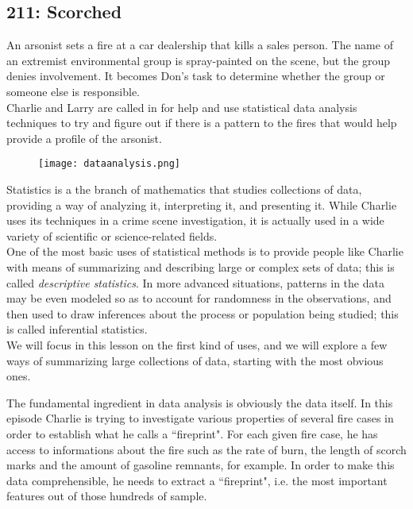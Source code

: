 \newpage
\subsection{211: Scorched}\label{211}

An arsonist sets a fire at a car dealership that kills a sales person. The name of an extremist environmental group is spray-painted on the scene, but the group denies involvement. It becomes Don's task to determine whether the group or someone else is responsible. \\

Charlie and Larry are called in for help and use statistical data analysis techniques to try and figure out if there is a pattern to the fires that would help provide a profile of the arsonist. \\

\begin{figure}[H]
   \centering
   \texttt{[image: dataanalysis.png]} 
\end{figure}


Statistics is a the branch of mathematics that studies collections of data, providing a way of analyzing it, interpreting it, and presenting it. While Charlie uses its techniques in a crime scene investigation, it is actually used in a wide variety of scientific or science-related fields. \\

One of the most basic uses of statistical methods is to provide people like Charlie with means of summarizing and describing large or complex sets of data; this is called \emph{descriptive statistics}. In more advanced situations, patterns in the data may be even modeled so as to account for randomness in the observations, and then used to draw inferences about the process or population being studied; this is called inferential statistics. \\

We will focus in this lesson on the first kind of uses, and we will explore a few ways of summarizing large collections of data, starting with the most obvious ones. \\


The fundamental ingredient in data analysis is obviously the data itself. In this episode Charlie is trying to investigate various properties of several fire cases in order to establish what he calls a ``fireprint". For each given fire case, he has access to informations about the fire such as the rate of burn, the length of scorch marks and the amount of gasoline remnants, for example. In order to make this data comprehensible, he needs to extract a ``fireprint", i.e. the most important features out of those hundreds of sample.

